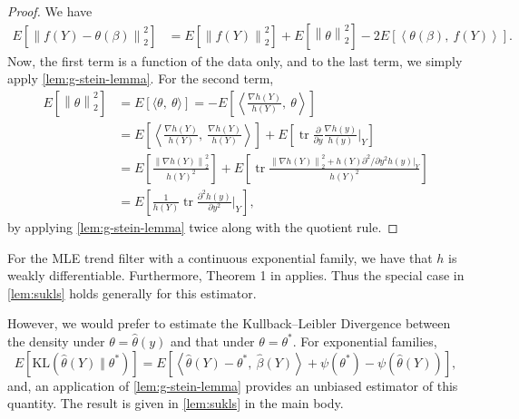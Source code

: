 \documentclass[ejs,noshowframe]{imsart}
\theoremstyle{plain}
\theoremstyle{definition}
\newcommand{\norm}[1]{\left\lVert #1 \right\rVert}
\newcommand{\E}{E}
\newcommand{\Expect}[1]{\E\left[#1\right]}
\newcommand{\given}{\mid}
\renewcommand{\hat}{\widehat}
\DeclareMathOperator*{\trace}{tr}
\newcommand{\KL}[2]{\mathrm{KL}(#1\; \Vert\; #2)}
\begin{document}
\begin{appendix}
\begin{proof}
	  We have
	  \begin{align}
		    \label{eq:14}
		    \Expect{\norm{f(Y) - \theta(\beta)}_2^2}
		    &= \Expect{\norm{f(Y)}_2^2} + \Expect{\norm{\theta}_2^2} -
		      2\Expect{\left\langle \theta(\beta),\ f(Y)\right\rangle}.
		  \end{align}
      Now, the first term is a function of the data only, and to the last term, 
      we simply apply
	  \autoref{lem:g-stein-lemma}. For the second term,
	  \begin{align}
		    \Expect{\norm{\theta}_2^2}
		    &=\Expect{\langle \theta,\ \theta \rangle}
		     = -\Expect{\left\langle\frac{\nabla h(Y)}{h(Y)},\ 
		\theta\right\rangle}\\
		    &= \Expect{\left\langle\frac{\nabla h(Y)}{h(Y)},\
			      \frac{\nabla h(Y)}{h(Y)}\right\rangle} + \Expect{\trace
			      \frac{\partial}{\partial y} \frac{\nabla h(y)}{h(y)}
			      \bigg\vert_Y}\\
		    &= \Expect{\frac{\norm{\nabla h(Y)}_2^2}{h(Y)^2}} + \Expect{\trace
			      \frac{\norm{\nabla h(Y)}_2^2 +h(Y) \partial^2/\partial y^2 
				h(y)\big\vert_Y}
			      {h(Y)^2}}\\
		    &=\Expect{ \frac{1}{h(Y)} \trace \frac{\partial^2 h(y)}{\partial 
				y^2}\bigg\vert_Y},
		  \end{align}
	  by applying \autoref{lem:g-stein-lemma} twice along with the
	  quotient rule.
	\end{proof}

For the MLE trend filter with a continuous exponential family, we have that $h$
is weakly differentiable. Furthermore, Theorem 1 in \citet{VaiterDeledalle2017}
applies. Thus the special case in \autoref{lem:sukls} holds generally for this estimator.

However, we would prefer to estimate the
Kullback--Leibler Divergence between the density under
$\theta=\hat\theta(y)$ and that under $\theta=\theta^*$.
For
exponential families,
\begin{equation}
	\Expect{\KL{\hat\theta(Y)}{\theta^*}}
	= \Expect{\left\langle \hat\theta(Y)-\theta^*,\ \hat\beta(Y)\right\rangle +
		\psi(\theta^*) -\psi\left( \hat\theta(Y) \right) },
\end{equation}
and, an application of \autoref{lem:g-stein-lemma} provides an
unbiased estimator of this quantity. The result is given in \autoref{lem:sukls}
in the main body.



\end{appendix}
\end{document}
